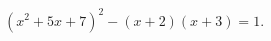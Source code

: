 \begin{ex}[type=equation]
	\begin{condition}
		$\left(x^2 + 5x + 7\right)^2 -  (x + 2)(x + 3) = 1.$
	\end{condition}
\end{ex}